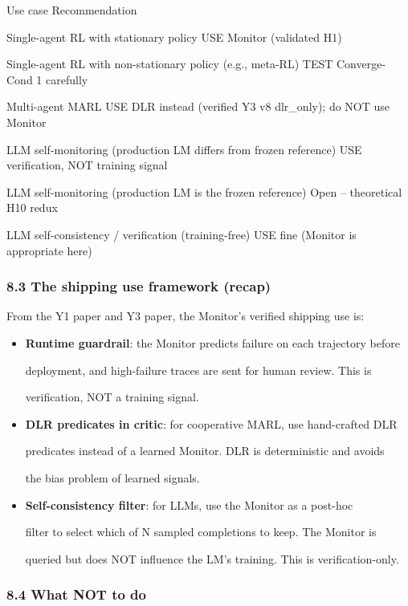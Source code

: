 \documentclass[11pt]{article}
\begin{document}
Use case \textbar{} Recommendation \textbar{}

Single-agent RL with stationary policy \textbar{} USE Monitor (validated
H1) \textbar{}

Single-agent RL with non-stationary policy (e.g., meta-RL) \textbar{}
TEST Converge-Cond 1 carefully \textbar{}

Multi-agent MARL \textbar{} USE DLR instead (verified Y3 v8 dlr\_only);
do NOT use Monitor \textbar{}

LLM self-monitoring (production LM differs from frozen reference)
\textbar{} USE verification, NOT training signal \textbar{}

LLM self-monitoring (production LM is the frozen reference) \textbar{}
Open -- theoretical H10 redux \textbar{}

LLM self-consistency / verification (training-free) \textbar{} USE fine
(Monitor is appropriate here) \textbar{}

\subsubsection{8.3 The shipping use framework
(recap)}\label{the-shipping-use-framework-recap}

From the Y1 paper and Y3 paper, the Monitor's verified shipping use is:

\begin{itemize}
\item
  \textbf{Runtime guardrail}: the Monitor predicts failure on each
  trajectory before

  deployment, and high-failure traces are sent for human review. This is

  verification, NOT a training signal.
\item
  \textbf{DLR predicates in critic}: for cooperative MARL, use
  hand-crafted DLR

  predicates instead of a learned Monitor. DLR is deterministic and
  avoids

  the bias problem of learned signals.
\item
  \textbf{Self-consistency filter}: for LLMs, use the Monitor as a
  post-hoc

  filter to select which of N sampled completions to keep. The Monitor
  is

  queried but does NOT influence the LM's training. This is
  verification-only.
\end{itemize}

\subsubsection{8.4 What NOT to do}\label{what-not-to-do}
\end{document}
